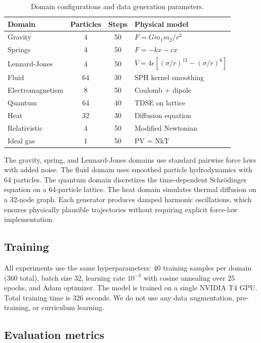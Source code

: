 \documentclass[10pt,twocolumn]{article}
\begin{document}
\begin{table}[ht]
\centering
\caption{Domain configurations and data generation parameters.}
\label{tab:domains}
\small
\begin{tabular}{@{}lccl@{}}
\toprule
Domain & Particles & Steps & Physical model \\
\midrule
Gravity & 4 & 50 & $F = Gm_1 m_2 / r^2$ \\
Springs & 4 & 50 & $F = -kx - c\dot{x}$ \\
Lennard-Jones & 4 & 50 & $V = 4\epsilon[(\sigma/r)^{12} - (\sigma/r)^6]$ \\
Fluid & 64 & 30 & SPH kernel smoothing \\
Electromagnetism & 8 & 50 & Coulomb + dipole \\
Quantum & 64 & 40 & TDSE on lattice \\
Heat & 32 & 30 & Diffusion equation \\
Relativistic & 4 & 50 & Modified Newtonian \\
Ideal gas & 1 & 50 & PV = NkT \\
\bottomrule
\end{tabular}
\end{table}

The gravity, spring, and Lennard-Jones domains use standard pairwise force laws with added noise. The fluid domain uses smoothed particle hydrodynamics with 64 particles. The quantum domain discretizes the time-dependent Schr\"{o}dinger equation on a 64-particle lattice. The heat domain simulates thermal diffusion on a 32-node graph. Each generator produces damped harmonic oscillations, which ensures physically plausible trajectories without requiring explicit force-law implementation.

\subsection{Training}

All experiments use the same hyperparameters: 40 training samples per domain (360 total), batch size 32, learning rate $10^{-3}$ with cosine annealing over 25 epochs, and Adam optimizer. The model is trained on a single NVIDIA T4 GPU. Total training time is 326 seconds. We do not use any data augmentation, pre-training, or curriculum learning.

\subsection{Evaluation metrics}
\end{document}
